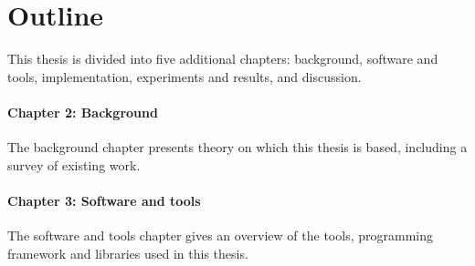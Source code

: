 \documentclass[USenglish]{ifimaster}  %
\begin{document}

\section{Outline}
This thesis is divided into five additional chapters: background, software and tools, implementation, experiments and results, and discussion. 	
	
\paragraph{Chapter 2: Background}
The background chapter presents theory on which this thesis is based, including a survey of existing work.

\paragraph{Chapter 3: Software and tools}
The software and tools chapter gives an overview of the tools, programming framework and libraries used in this thesis. 	
\end{document}
